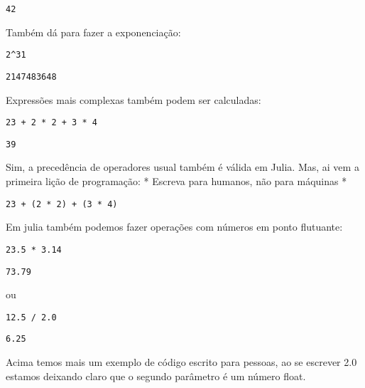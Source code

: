\documentclass[a4paper]{article}
\begin{document}
\begin{verbatim}
42
\end{verbatim}


Também dá para fazer a exponenciação:

\lstset{language=ein-julia,label= ,caption= ,captionpos=b,numbers=none}
\begin{lstlisting}
2^31
\end{lstlisting}

\begin{verbatim}
2147483648
\end{verbatim}

Expressões mais complexas também podem ser calculadas:

\lstset{language=ein-julia,label= ,caption= ,captionpos=b,numbers=none}
\begin{lstlisting}
23 + 2 * 2 + 3 * 4
\end{lstlisting}

\begin{verbatim}
39
\end{verbatim}

 Sim, a precedência de operadores usual também é válida em Julia. Mas, ai
vem a primeira lição de programação: * Escreva para humanos, não para máquinas *

\lstset{language=ein-julia,label= ,caption= ,captionpos=b,numbers=none}
\begin{lstlisting}
23 + (2 * 2) + (3 * 4)
\end{lstlisting}

Em julia também podemos fazer operações com números em ponto flutuante:

\lstset{language=ein-julia,label= ,caption= ,captionpos=b,numbers=none}
\begin{lstlisting}
23.5 * 3.14
\end{lstlisting}

\begin{verbatim}
73.79
\end{verbatim}


ou
\lstset{language=ein-julia,label= ,caption= ,captionpos=b,numbers=none}
\begin{lstlisting}
12.5 / 2.0
\end{lstlisting}

\begin{verbatim}
6.25
\end{verbatim}


Acima temos mais um exemplo de código escrito para pessoas, ao se escrever
2.0 estamos deixando claro que o segundo parâmetro é um número float.
\end{document}
